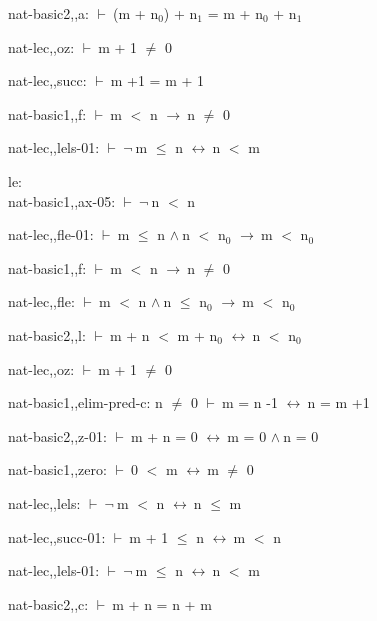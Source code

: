 \documentclass[a4paper]{article}
\newcommand{\Fol}{\mbox{$\vdash\ $}}
\newcommand{\Not}{\mbox{$\neg\ $}}
\newcommand{\And}{\mbox{$\wedge\ $}}
\newcommand{\Imp}{\mbox{$\rightarrow\ $}}
\newcommand{\Equiv}{\mbox{$\leftrightarrow\ $}}
\begin{document}
nat-basic2,,a: 
 \Fol (m + $\mbox{n}_{0}$) + $\mbox{n}_{1}$ = m + $\mbox{n}_{0}$ + $\mbox{n}_{1}$



nat-lec,,oz: 
 \Fol m + 1 $\neq$ 0



nat-lec,,succ: 
 \Fol m +1 = m + 1



nat-basic1,,f: 
 \Fol m $<$ n \Imp n $\neq$ 0



nat-lec,,lels-01: 
 \Fol \Not m $\le$ n \Equiv n $<$ m



\bigskip

le:\\ nat-basic1,,ax-05: 
 \Fol \Not n $<$ n



nat-lec,,fle-01: 
 \Fol m $\le$ n \And n $<$ $\mbox{n}_{0}$ \Imp m $<$ $\mbox{n}_{0}$



nat-basic1,,f: 
 \Fol m $<$ n \Imp n $\neq$ 0



nat-lec,,fle: 
 \Fol m $<$ n \And n $\le$ $\mbox{n}_{0}$ \Imp m $<$ $\mbox{n}_{0}$



nat-basic2,,l: 
 \Fol m + n $<$ m + $\mbox{n}_{0}$ \Equiv n $<$ $\mbox{n}_{0}$



nat-lec,,oz: 
 \Fol m + 1 $\neq$ 0



nat-basic1,,elim-pred-c: 
n $\neq$ 0
 \Fol m = n -1 \Equiv n = m +1



nat-basic2,,z-01: 
 \Fol m + n = 0 \Equiv m = 0 \And n = 0



nat-basic1,,zero: 
 \Fol 0 $<$ m \Equiv m $\neq$ 0



nat-lec,,lels: 
 \Fol \Not m $<$ n \Equiv n $\le$ m



nat-lec,,succ-01: 
 \Fol m + 1 $\le$ n \Equiv m $<$ n



nat-lec,,lels-01: 
 \Fol \Not m $\le$ n \Equiv n $<$ m



nat-basic2,,c: 
 \Fol m + n = n + m
\end{document}
